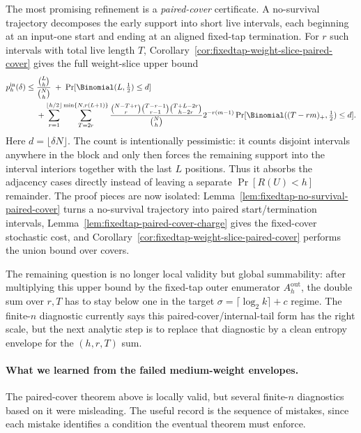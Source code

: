 The most promising refinement is a \emph{paired-cover} certificate. A no-survival trajectory decomposes the early
support into short live intervals, each beginning at an input-one start and ending at an aligned fixed-tap termination.
For \(r\) such intervals with total live length \(T\), Corollary~\ref{cor:fixedtap-weight-slice-paired-cover} gives the
full weight-slice upper bound
\[
\begin{aligned}
p_h^{\mathrm{in}}(\delta)
\le\;&
\frac{\binom{L}{h}}{\binom{N}{h}}
\;+\;
\Pr[\Binomial(L,\tfrac12)\le d]
\\
&+
\sum_{r=1}^{\lfloor h/2\rfloor}
\sum_{T=2r}^{\min\{N,r(L+1)\}}
\frac{
\binom{N-T+r}{r}
\binom{T-r-1}{r-1}
\binom{T+L-2r}{h-2r}
}{
\binom{N}{h}
}
2^{-r(m-1)}
\Pr[\Binomial((T-rm)_+,\tfrac12)\le d].
\end{aligned}
\]
Here \(d=\lfloor\delta N\rfloor\). The count is intentionally pessimistic: it counts disjoint intervals anywhere in the
block and only then forces the remaining support into the interval interiors together with the last \(L\) positions.
Thus it absorbs the adjacency cases directly instead of leaving a separate
\(\Pr[R(U)<h]\) remainder. The proof pieces are now isolated: Lemma~\ref{lem:fixedtap-no-survival-paired-cover} turns a
no-survival trajectory into paired start/termination intervals, Lemma~\ref{lem:fixedtap-paired-cover-charge} gives the
fixed-cover stochastic cost, and Corollary~\ref{cor:fixedtap-weight-slice-paired-cover} performs the union bound over
covers.

The remaining question is no longer local validity but global summability: after multiplying this upper bound by the
fixed-tap outer enumerator \(A_h^{\mathrm{out}}\), the double sum over \(r,T\) has to stay below one in the target
\(\sigma=\lceil\log_2 k\rceil+c\) regime. The finite-\(n\) diagnostic currently says this paired-cover/internal-tail
form has the right scale, but the next analytic step is to replace that diagnostic by a clean entropy envelope for the
\((h,r,T)\) sum.

\paragraph{What we learned from the failed medium-weight envelopes.}
The paired-cover theorem above is locally valid, but several finite-\(n\) diagnostics based on it were misleading.
The useful record is the sequence of mistakes, since each mistake identifies a condition the eventual theorem must
enforce.

